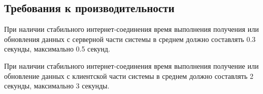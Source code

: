 \documentclass[other-needs.tex]{subfiles}
\begin{document}
\subsection{Требования к производительности}
\par
При наличии стабильного интернет-соединения время выполнения получения или
обновления данных с серверной части системы в среднем должно составлять 0.3 секунды,
максимально 0.5 секунд.
\par
При наличии стабильного интернет-соединения время выполнения получение или
обновление данных с клиентской части системы в среднем должно составлять 2 секунды,
максимально 3 секунды.
\end{document}
